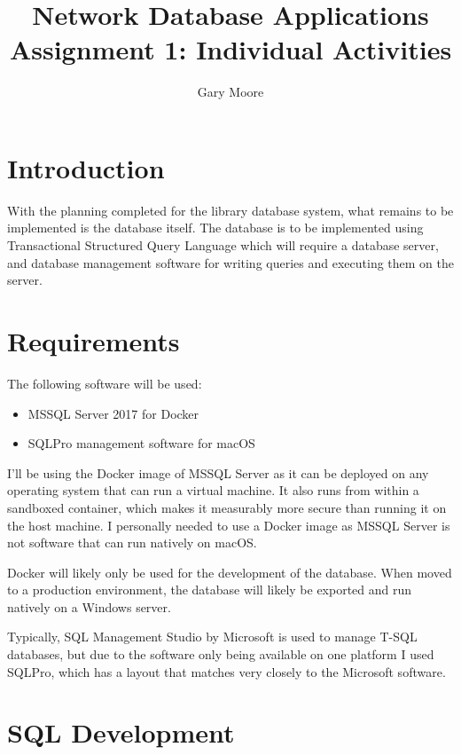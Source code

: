 \documentclass[11pt,a4paper]{scrartcl}
\author{Gary Moore}
\title{Network Database Applications Assignment 1: Individual Activities}
\begin{document}
	\maketitle
	
	\section{Introduction}\label{introduction}
	
	With the planning completed for the library database system, what remains to be implemented is the database itself. The database is to be implemented using Transactional Structured Query Language which will require a database server, and database management software for writing queries and executing them on the server.
	
	\section{Requirements}\label{requirements}
	
	The following software will be used:
	
	\begin{itemize}
		\item MSSQL Server 2017 for Docker
		\item SQLPro management software for macOS
	\end{itemize}
	
	I’ll be using the Docker image of MSSQL Server as it can be deployed on any operating system that can run a virtual machine. It also runs from within a sandboxed container, which makes it measurably more secure than running it on the host machine. I personally needed to use a Docker image as MSSQL Server is not software that can run natively on macOS.
	
	Docker will likely only be used for the development of the database. When moved to a production environment, the database will likely be exported and run natively on a Windows server.
	
	Typically, SQL Management Studio by Microsoft is used to manage T-SQL databases, but due to the software only being available on one platform I used SQLPro, which has a layout that matches very closely to the Microsoft software.
	
	\section{SQL Development}\label{sql requirements}
	
\end{document}
